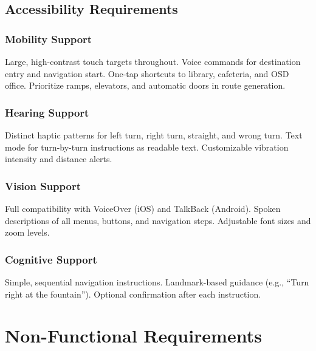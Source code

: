 \documentclass[12pt]{article}
\begin{document}
\subsection{Accessibility Requirements}

\subsubsection{Mobility Support}
Large, high-contrast touch targets throughout. Voice commands for destination entry and navigation start. One-tap shortcuts to library, cafeteria, and OSD office. Prioritize ramps, elevators, and automatic doors in route generation.

\subsubsection{Hearing Support}
Distinct haptic patterns for left turn, right turn, straight, and wrong turn. Text mode for turn-by-turn instructions as readable text. Customizable vibration intensity and distance alerts.

\subsubsection{Vision Support}
Full compatibility with VoiceOver (iOS) and TalkBack (Android). Spoken descriptions of all menus, buttons, and navigation steps. Adjustable font sizes and zoom levels.

\subsubsection{Cognitive Support}
Simple, sequential navigation instructions. Landmark-based guidance (e.g., ``Turn right at the fountain''). Optional confirmation after each instruction.

\section{Non-Functional Requirements}
\end{document}
